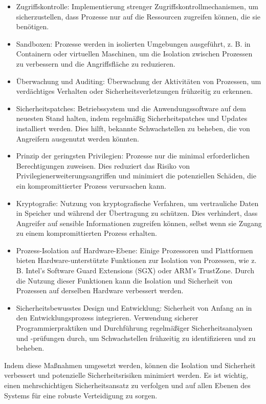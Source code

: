 \begin{itemize}
\item Zugriffskontrolle: Implementierung strenger Zugriffskontrollmechanismen, um sicherzustellen, dass Prozesse nur auf die Ressourcen zugreifen können, die sie benötigen.
\item Sandboxen: Prozesse werden in isolierten Umgebungen ausgeführt, z. B. in Containern oder virtuellen Maschinen, um die Isolation zwischen Prozessen zu verbessern und die Angriffsfläche zu reduzieren.
\item Überwachung und Auditing: Überwachung der Aktivitäten von Prozessen, um verdächtiges Verhalten oder Sicherheitsverletzungen frühzeitig zu erkennen.
\item Sicherheitspatches: Betriebssystem und die Anwendungssoftware auf dem neuesten Stand halten, indem regelmäßig Sicherheitspatches und Updates installiert werden. Dies hilft, bekannte Schwachstellen zu beheben, die von Angreifern ausgenutzt werden könnten.
\item Prinzip der geringsten Privilegien: Prozesse nur die minimal erforderlichen Berechtigungen zuweisen. Dies reduziert das Risiko von Privilegienerweiterungsangriffen und minimiert die potenziellen Schäden, die ein kompromittierter Prozess verursachen kann.
\item Kryptografie: Nutzung von kryptografische Verfahren, um vertrauliche Daten in Speicher und während der Übertragung zu schützen. Dies verhindert, dass Angreifer auf sensible Informationen zugreifen können, selbst wenn sie Zugang zu einem kompromittierten Prozess erhalten.
\item Prozess-Isolation auf Hardware-Ebene: Einige Prozessoren und Plattformen bieten Hardware-unterstützte Funktionen zur Isolation von Prozessen, wie z. B. Intel's Software Guard Extensions (SGX) oder ARM's TrustZone. Durch die Nutzung dieser Funktionen kann die Isolation und Sicherheit von Prozessen auf derselben Hardware verbessert werden.
\item Sicherheitsbewusstes Design und Entwicklung: Sicherheit von Anfang an in den Entwicklungsprozess integrieren. Verwendung sicherer Programmierpraktiken und Durchführung regelmäßiger Sicherheitsanalysen und -prüfungen durch, um Schwachstellen frühzeitig zu identifizieren und zu beheben.
\end{itemize}
Indem diese Maßnahmen umgesetzt werden, können die Isolation und Sicherheit verbessert und potenzielle Sicherheitsrisiken minimiert werden. Es ist wichtig, einen mehrschichtigen Sicherheitsansatz zu verfolgen und auf allen Ebenen des Systems für eine robuste Verteidigung zu sorgen.

